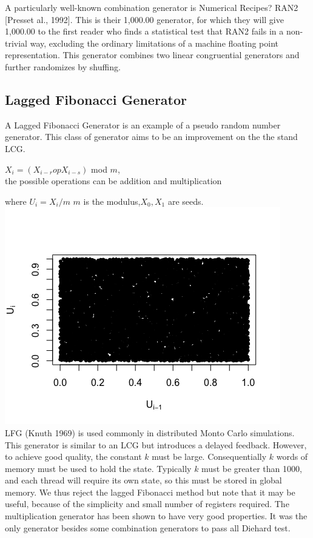 \documentclass[a4paper,11pt]{article}
\begin{document}
{{ A particularly well-known combination generator is Numerical Recipes? RAN2 [Presset al., 1992]. This is their 1,000.00 generator, for which they will give 1,000.00 to the first reader who finds a statistical test that RAN2 fails in a non-trivial way, excluding the ordinary limitations of a machine floating point representation. This generator combines two linear congruential generators and further randomizes by shuffing.
}



\subsection{Lagged Fibonacci Generator}
A Lagged Fibonacci Generator is an example of a pseudo random number generator. This class of generator aims to be an improvement on the the stand LCG. 
{\begin{center}
$X_i=(X_{i-r}opX_{i-s})$ mod $m$,\\the possible operations can be addition and multiplication \\
\end{center}
where $U_i=X_i/m$ $m$ is the modulus,$X_0,X_1$ are seeds.\\

\includegraphics[scale=0.8]{fb}\\

 LFG (Knuth 1969) is used commonly in distributed Monto Carlo simulations. This generator is similar to an LCG but introduces a delayed feedback. However, to achieve good quality, the constant $k$ must be large. Consequentially $k$ words of memory must be used to hold the state. Typically
$k$ must be greater than 1000, and each thread will require its own state, so this must be stored in global memory. We thus reject the lagged Fibonacci method but note that it
may be useful, because of the simplicity and small number of registers required.  The multiplication generator has been shown to have very good properties. It was the only 
generator besides some combination generators to pass all Diehard test. 

}}
\end{document}
